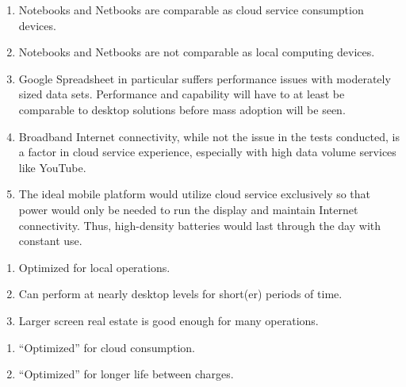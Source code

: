 \documentclass[letterpaper]{article}
\begin{document}
{\begin{center}
\end{center}

\begin{enumerate}

\item Notebooks and Netbooks are comparable as cloud service consumption
  devices.

\item Notebooks and Netbooks are not comparable as local computing devices.

\item Google Spreadsheet in particular suffers performance issues with
  moderately sized data sets.  Performance and capability will have to at least
  be comparable to desktop solutions before mass adoption will be seen.

\item Broadband Internet connectivity, while not the issue in the tests
  conducted, is a factor in cloud service experience, especially with high data
  volume services like YouTube.

\item The ideal mobile platform would utilize cloud service exclusively so that
  power would only be needed to run the display and maintain Internet
  connectivity.  Thus, high-density batteries would last through the day with
  constant use.

\end{enumerate}

\newpage


\begin{enumerate}

\item Optimized for local operations.

\item Can perform at nearly desktop levels for short(er) periods of time.

\item Larger screen real estate is good enough for many operations.

\end{enumerate}

\newpage

\begin{enumerate}


\item ``Optimized'' for cloud consumption.

\item ``Optimized'' for longer life between charges.


\end{enumerate}}
\end{document}
